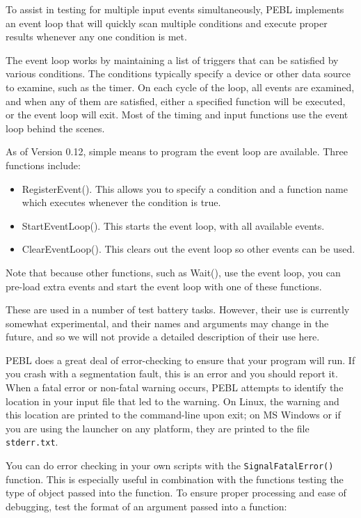 To assist in testing for multiple input events simultaneously, 
PEBL implements an event loop that will quickly scan multiple conditions
and execute proper results whenever any one condition is met.  

The event loop works by maintaining a list of triggers that can be satisfied by various conditions. The conditions typically specify a device or other data source to examine, such as the timer.  On each cycle of the loop, all events are examined, and when any of them are satisfied, either a specified function will be executed, or the event loop will exit.  Most of the timing and input functions use the event loop behind the scenes.

As of Version  0.12, simple means to program the event loop are available.  Three functions include:
\begin{itemize}
\item RegisterEvent().  This allows you to specify a condition and a function name which executes whenever the condition is true.      
\item StartEventLoop().  This starts the event loop, with all available events.     
\item ClearEventLoop().  This clears out the event loop so other events can be used.     
\end{itemize}
Note that because other functions, such as Wait(), use the event loop, you can pre-load extra events and start the event loop with one of these functions.

These are used in a number of test battery tasks.  However, their use is currently somewhat experimental, and their names and arguments may change in the future, and so we will not provide a detailed description of their use here.



PEBL does a great deal of error-checking to ensure that your program
will run.  If you crash with a segmentation fault, this is an error
and you should report it.  When a fatal error or non-fatal warning
occurs, PEBL attempts to identify the location in your input file that
led to the warning.  On Linux, the warning and this location are
printed to the command-line upon exit; on MS Windows or if you are using the launcher on any platform, they are printed
to the file \texttt{stderr.txt}.

You can do error checking  in your own scripts with the
\texttt{SignalFatalError()} function.  This is especially useful in
combination with the functions testing the type of object passed into 
the function.  To ensure proper processing and ease of debugging, test
the format of an argument passed into a function:

